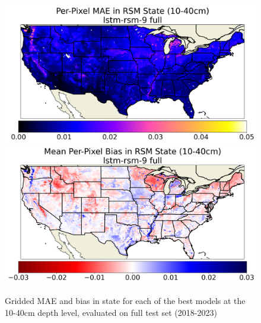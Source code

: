 \begin{figure}[hp!]
    \includegraphics[width=.48\linewidth,draft=false]{figures/grid-eval_best_full/eval-grid_full_lstm-rsm-9_rsm-40_spatial-stats_abs-err_state-err-abs-mean.png}
    \includegraphics[width=.48\linewidth,draft=false]{figures/grid-eval_best_full/eval-grid_full_lstm-rsm-9_rsm-40_spatial-stats_bias_state-err-bias-mean.png}

    \caption{Gridded MAE and bias in state for each of the best models at the 10-40cm depth level, evaluated on full test set (2018-2023)}
    \label{grid-full_rsm-40}
\end{figure}

